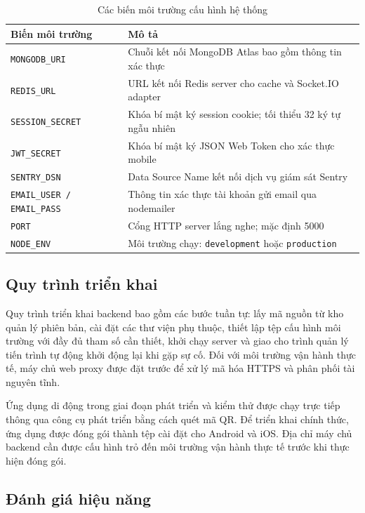 \documentclass[../DoAn.tex]{subfiles}
\begin{document}
\begin{table}[H]
\centering
\caption{Các biến môi trường cấu hình hệ thống}
\label{tab:env_config}
\small
\begin{tabular}{|p{4.6cm}|p{8.8cm}|}
\hline
\textbf{Biến môi trường} & \textbf{Mô tả} \\
\hline
\texttt{MONGODB\_URI} & Chuỗi kết nối MongoDB Atlas bao gồm thông tin xác thực \\
\hline
\texttt{REDIS\_URL} & URL kết nối Redis server cho cache và Socket.IO adapter \\
\hline
\texttt{SESSION\_SECRET} & Khóa bí mật ký session cookie; tối thiểu 32 ký tự ngẫu nhiên \\
\hline
\texttt{JWT\_SECRET} & Khóa bí mật ký JSON Web Token cho xác thực mobile \\
\hline
\texttt{SENTRY\_DSN} & Data Source Name kết nối dịch vụ giám sát Sentry \\
\hline
\texttt{EMAIL\_USER / EMAIL\_PASS} & Thông tin xác thực tài khoản gửi email qua nodemailer \\
\hline
\texttt{PORT} & Cổng HTTP server lắng nghe; mặc định 5000 \\
\hline
\texttt{NODE\_ENV} & Môi trường chạy: \texttt{development} hoặc \texttt{production} \\
\hline
\end{tabular}
\end{table}

\subsection*{Quy trình triển khai}

Quy trình triển khai backend bao gồm các bước tuần tự: lấy mã nguồn từ kho
quản lý phiên bản, cài đặt các thư viện phụ thuộc, thiết lập tệp cấu hình môi
trường với đầy đủ tham số cần thiết, khởi chạy server và giao cho trình quản lý
tiến trình tự động khởi động lại khi gặp sự cố. Đối với môi trường vận hành
thực tế, máy chủ web proxy được đặt trước để xử lý mã hóa HTTPS và phân phối
tài nguyên tĩnh.

Ứng dụng di động trong giai đoạn phát triển và kiểm thử được chạy trực tiếp
thông qua công cụ phát triển bằng cách quét mã QR. Để triển khai chính thức,
ứng dụng được đóng gói thành tệp cài đặt cho Android và iOS. Địa chỉ máy chủ
backend cần được cấu hình trỏ đến môi trường vận hành thực tế trước khi thực
hiện đóng gói.

\subsection*{Đánh giá hiệu năng}
\end{document}
